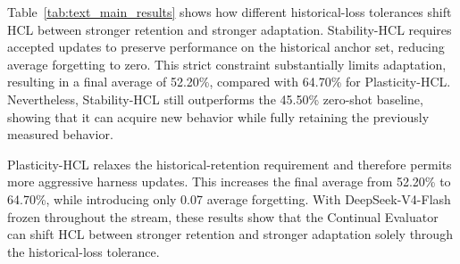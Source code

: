 \documentclass{article}
\begin{document}
\begin{table}[t]
    \centering
    \caption{
    Final performance after the four-task textual-reasoning stream with
    DeepSeek-V4-Flash as the frozen foundation model. The Zero-shot baseline
    evaluates each task independently without sequential harness updates.
     The best and second-best results in each metric
    column are marked in bold and underlined, respectively.
    }
    \label{tab:text_main_results}
\end{table}

Table~\ref{tab:text_main_results} shows how different historical-loss tolerances shift HCL between stronger retention and stronger adaptation. Stability-HCL requires accepted
updates to preserve performance on the historical anchor set, reducing average
forgetting to zero. This strict constraint substantially
limits adaptation, resulting in a final average of 52.20\%, compared with
64.70\% for Plasticity-HCL. Nevertheless, Stability-HCL still outperforms the
45.50\% zero-shot baseline, showing that it can acquire new behavior while
fully retaining the previously measured behavior.

Plasticity-HCL relaxes the historical-retention requirement and therefore
permits more aggressive harness updates. This increases the final average
from 52.20\% to 64.70\%, while introducing only 0.07 average forgetting.
With DeepSeek-V4-Flash frozen throughout the stream, these results show that
the Continual Evaluator can shift HCL between stronger retention and stronger
adaptation solely through the historical-loss tolerance.
\end{document}
